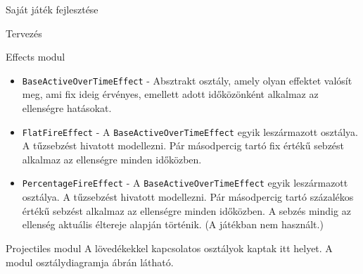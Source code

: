 \begin{MyChapter}{Saját játék fejlesztése}
\begin{MySection}{Tervezés}
\begin{MySubSection}{Effects modul}
\begin{itemize}
				\item \texttt{BaseActiveOverTimeEffect} - Absztrakt osztály, amely olyan effektet valósít meg, ami fix ideig érvényes, emellett adott időközönként alkalmaz az ellenségre hatásokat.

				\item \texttt{FlatFireEffect} - A \texttt{BaseActiveOverTimeEffect} egyik leszármazott osztálya. A tűzsebzést hivatott modellezni. Pár másodpercig tartó fix értékű sebzést alkalmaz az ellenségre minden időközben.
				
				\item \texttt{PercentageFireEffect} - A \texttt{BaseActiveOverTimeEffect} egyik leszármazott osztálya. A tűzsebzést hivatott modellezni. Pár másodpercig tartó százalékos értékű sebzést alkalmaz az ellenségre minden időközben. A sebzés mindig az ellenség aktuális éltereje alapján történik. (A játékban nem használt.)
			\end{itemize}
		\end{MySubSection}
	
		\begin{MySubSection}{Projectiles modul}
			A lövedékekkel kapcsolatos osztályok kaptak itt helyet.
			A modul osztálydiagramja  ábrán látható.
		

\end{MySubSection}
\end{MySection}
\end{MyChapter}
